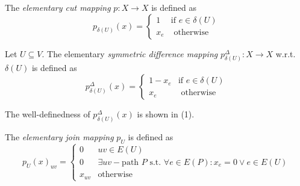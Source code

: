 \begin{definition}
The \textit{elementary cut mapping} $p:X \to X$ is defined as
\[ p_{\delta(U)}(x)= 
\begin{cases}
    1& \text{if } e \in \delta(U) \\
    x_e& \text{ otherwise }
\end{cases} \] 
\end{definition}

\begin{definition} Let $U \subseteq V$. The elementary \textit{symmetric difference mapping} $p^{\Delta}_{\delta(U)}: X \to X$ w.r.t. $\delta(U)$ is defined as 
\[ p^{\Delta}_{\delta(U)}(x)=
\begin{cases}
    1-x_e& \text{if } e \in \delta(U) \\
    x_e& \text{ otherwise }
\end{cases} \]
\end{definition}
The well-definedness of $p^{\Delta}_{\delta(U)}(x)$ is shown in (1). 
\begin{definition}
The \textit{elementary join mapping} $p_U$ is defined as 
\begin{equation*}
    p_U(x)_{uv}=
    \begin{cases}
        0& uv \in E(U) \\
        0 & \exists uv-\text{path } P \text{ s.t. } \forall e \in E(P): x_e=0 \lor e \in E(U) \\
        x_{uv} & \text{otherwise}
    \end{cases}
\end{equation*}
\end{definition}
